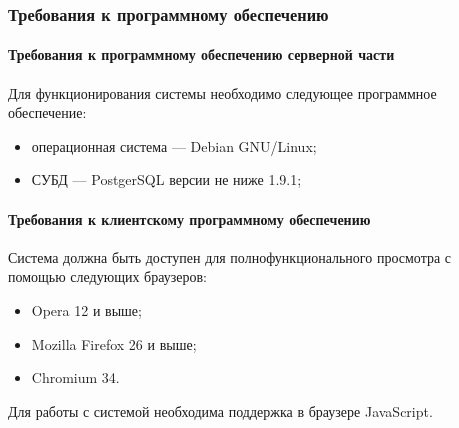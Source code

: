 \subsubsection{Требования к программному обеспечению}


\paragraph{Требования к программному обеспечению серверной части}
Для функционирования системы необходимо следующее программное обеспечение:
\begin{itemize}
\item операционная система --– Debian GNU/Linux;
\item СУБД –-- PostgerSQL версии не ниже 1.9.1;
\end{itemize}

\paragraph{Требования к клиентскому программному обеспечению}
Система должна быть доступен для полнофункционального просмотра с помощью следующих браузеров:
\begin{itemize}
\item Opera 12 и выше;
\item Mozilla Firefox 26 и выше;
\item Chromium 34.
\end{itemize}
Для работы с системой необходима поддержка в браузере JavaScript.
